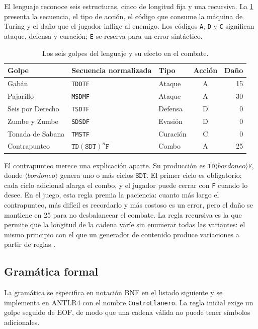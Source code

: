 \documentclass[9pt]{ieeeconf}
\newcommand{\tk}[1]{\texttt{#1}}
\begin{document}
El lenguaje reconoce seis estructuras, cinco de longitud fija y una recursiva. La \cref{tab:golpes} presenta la secuencia, el tipo de acción, el código que consume la máquina de Turing y el daño que el jugador inflige al enemigo. Los códigos \texttt{A}, \texttt{D} y \texttt{C} significan ataque, defensa y curación; \texttt{E} se reserva para un error sintáctico.

\begin{table}[t]
\centering
\caption{Los seis golpes del lenguaje y su efecto en el combate.}
\label{tab:golpes}
\setlength{\tabcolsep}{4pt}
\begin{tabular}{l l l c r}
\toprule
\textbf{Golpe} & \textbf{Secuencia normalizada} & \textbf{Tipo} & \textbf{Acción} & \textbf{Daño} \\
\midrule
Gabán & \tk{TDDTF} & Ataque & A & 15 \\
Pajarillo & \tk{MSDMF} & Ataque & A & 30 \\
Seis por Derecho & \tk{TSDTF} & Defensa & D & 0 \\
Zumbe y Zumbe & \tk{SDSDF} & Evasión & D & 0 \\
Tonada de Sabana & \tk{TMSTF} & Curación & C & 0 \\
Contrapunteo & $\tk{TD}(\tk{SDT})^n\tk{F}$ & Combo & A & 25 \\
\bottomrule
\end{tabular}
\end{table}

El contrapunteo merece una explicación aparte. Su producción es $\tk{TD}\langle bordoneo\rangle\tk{F}$, donde $\langle bordoneo\rangle$ genera uno o más ciclos $\tk{SDT}$. El primer ciclo es obligatorio; cada ciclo adicional alarga el combo, y el jugador puede cerrar con \texttt{F} cuando lo desee. En el juego, esta regla premia la paciencia: cuanto más largo el contrapunteo, más difícil es recordarlo y más costoso es un error, pero el daño se mantiene en 25 para no desbalancear el combate. La regla recursiva es la que permite que la longitud de la cadena varíe sin enumerar todas las variantes: el mismo principio con el que un generador de contenido produce variaciones a partir de reglas \cite{shaker2016}.

\subsection{Gramática formal}
\label{sec:gramatica}

La gramática se especifica en notación BNF en el listado siguiente y se implementa en ANTLR4 con el nombre \texttt{CuatroLlanero}. La regla inicial exige un golpe seguido de EOF, de modo que una cadena válida no puede tener símbolos adicionales.
\end{document}
